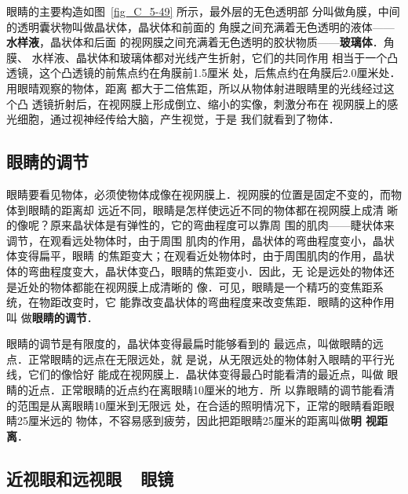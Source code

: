 眼睛的主要构造如图~\ref{fig_C_5-49} 所示，最外层的无色透明部
分叫做角膜，中间的透明囊状物叫做晶状体，晶状体和前面的
角膜之间充满着无色透明的液体——\textbf{水样液}，晶状体和后面
的视网膜之间充满着无色透明的胶状物质——\textbf{玻璃体}．角膜、
水样液、晶状体和玻璃体都对光线产生折射，它们的共同作用
相当于一个凸透镜，这个凸透镜的前焦点约在角膜前1.5厘米
处，后焦点约在角膜后2.0厘米处．用眼晴观察的物体，距离
都大于二倍焦距，所以从物体射进眼睛里的光线经过这个凸
透镜折射后，在视网膜上形成倒立、缩小的实像，刺激分布在
视网膜上的感光细胞，通过视神经传给大脑，产生视觉，于是
我们就看到了物体．

\subsection{眼睛的调节}

眼睛要看见物体，必须使物体成像在视网膜上．视网膜的位置是固定不变的，而物体到眼睛的距离却
远近不同，眼睛是怎样使远近不同的物体都在视网膜上成清
晰的像呢？原来晶状体是有弹性的，它的弯曲程度可以靠周
围的肌肉——睫状体来调节，在观看远处物体时，由于周围
肌肉的作用，晶状体的弯曲程度变小，晶状体变得扁平，眼睛
的焦距变大；在观看近处物体时，由于周围肌肉的作用，晶状
体的弯曲程度变大，晶状体变凸，眼睛的焦距变小．因此，无
论是远处的物体还是近处的物体都能在视网膜上成清晰的
像．可见，眼睛是一个精巧的变焦距系统，在物距改变时，它
能靠改变晶状体的弯曲程度来改变焦距．眼睛的这种作用叫
做\textbf{眼睛的调节}．

眼睛的调节是有限度的，晶状体变得最扁时能够看到的
最远点，叫做眼睛的远点．正常眼睛的远点在无限远处，就
是说，从无限远处的物体射入眼睛的平行光线，它们的像恰好
能成在视网膜上．晶状体变得最凸时能看清的最近点，叫做
眼睛的近点．正常眼睛的近点约在离眼睛10厘米的地方．所
以靠眼睛的调节能看清的范围是从离眼睛10厘米到无限远
处，在合适的照明情况下，正常的眼睛看距眼睛25厘米远的
物体，不容易感到疲劳，因此把距眼睛25厘米的距离叫做\textbf{明
视距离}．

\subsection{近视眼和远视眼~~眼镜}

